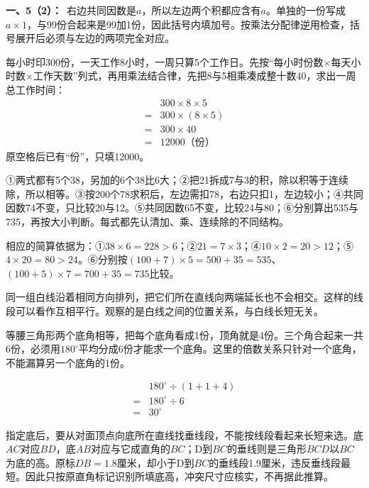 \documentclass[multi=snippet,border=0pt]{standalone}
\newenvironment{snippet}[3]{\begin{minipage}{#1bp}\color{answerred}\fontsize{#2}{#3}\selectfont\raggedright}{\end{minipage}}
\begin{document}
\begin{snippet}{505}{11.5}{14}\textbf{一、5（2）：}\ 右边共同因数是\(a\)，所以左边两个积都应含有\(a\)。单独的一份写成\(a\times1\)，与99份合起来是99加1份，因此括号内填加号。按乘法分配律逆用检查，括号展开后必须与左边的两项完全对应。\end{snippet}
\begin{snippet}{505}{11.5}{14}每小时印300份，一天工作8小时，一周只算5个工作日。先按“每小时份数\(\times\)每天小时数\(\times\)工作天数”列式，再用乘法结合律，先把8与5相乘凑成整十数40，求出一周总工作时间：\[\begin{aligned}&300\times8\times5\\={}&300\times(8\times5)\\={}&300\times40\\={}&12000\text{（份）}\end{aligned}\]原空格后已有“份”，只填12000。\end{snippet}
\begin{snippet}{505}{11.5}{14}①两式都有5个38，另加的6个38比6大；②把21拆成7与3的积，除以积等于连续除，所以相等。③按200个78求积后，左边需扣78，右边只扣1，左边较小；④共同因数74不变，只比较20与12。⑤共同因数65不变，比较24与80；⑥分别算出535与735，再按大小判断。每式都先认清加、乘、连续除的不同结构。\par 相应的简算依据为：①\(38\times6=228>6\)；②\(21=7\times3\)；④\(10\times2=20>12\)；⑤\(4\times20=80>24\)。⑥分别按\((100+7)\times5=500+35=535\)、\((100+5)\times7=700+35=735\)比较。\end{snippet}
\begin{snippet}{505}{11.5}{14}同一组白线沿着相同方向排列，把它们所在直线向两端延长也不会相交。这样的线段可以看作互相平行。观察的是白线之间的位置关系，与白线长短无关。\end{snippet}
\begin{snippet}{505}{11.5}{14}等腰三角形两个底角相等，把每个底角看成1份，顶角就是4份。三个角合起来一共6份，必须用\(180^\circ\)平均分成6份才能求一个底角。这里的倍数关系只针对一个底角，不能漏算另一个底角的1份。\par \[\begin{aligned}&180^\circ\div(1+1+4)\\={}&180^\circ\div6\\={}&30^\circ\end{aligned}\]\end{snippet}
\begin{snippet}{505}{11.5}{14}指定底后，要从对面顶点向底所在直线找垂线段，不能按线段看起来长短来选。底\(AC\)对应\(BD\)，底\(AB\)对应与它成直角的\(BC\)；D到\(BC\)的垂线则是三角形\(BCD\)以\(BC\)为底的高。原标\(DB=1.8\)厘米，却小于D到\(BC\)的垂线段1.9厘米，违反垂线段最短。因此只按原直角标记识别所填底高，冲突尺寸应核实，不再据此推算。\end{snippet}
\end{document}
